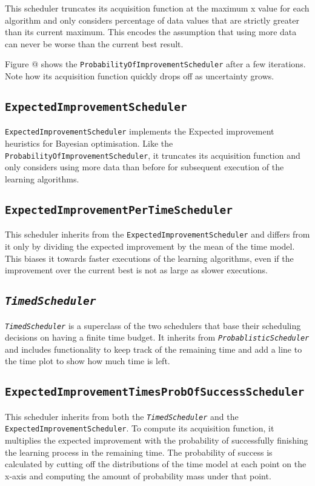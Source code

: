 \documentclass[a4paper,12pt,twoside,openright]{report}
\begin{document}
This scheduler truncates its acquisition function at the maximum x value for each algorithm and only considers percentage of data values that are strictly greater than its current maximum. This encodes the assumption that using more data can never be worse than the current best result.

Figure @ shows the \texttt{ProbabilityOfImprovementScheduler} after a few iterations. Note how its acquisition function quickly drops off as uncertainty grows.

\subsection{\texttt{ExpectedImprovementScheduler}}
\texttt{ExpectedImprovementScheduler} implements the Expected improvement heuristics for Bayesian optimisation. Like the \texttt{ProbabilityOfImprovementScheduler}, it truncates its acquisition function and only considers using more data than before for subsequent execution of the learning algorithms.

\subsection{\texttt{ExpectedImprovementPerTimeScheduler}}
This scheduler inherits from the \texttt{ExpectedImprovementScheduler} and differs from it only by dividing the expected improvement by the mean of the time model. This biases it towards faster executions of the learning algorithms, even if the improvement over the current best is not as large as slower executions.

\subsection{\texttt{\textit{TimedScheduler}}}
\texttt{\textit{TimedScheduler}} is a superclass of the two schedulers that base their scheduling decisions on having a finite time budget. It inherits from \texttt{\textit{ProbablisticScheduler}} and includes functionality to keep track of the remaining time and add a line to the time plot to show how much time is left.

\subsection{\texttt{ExpectedImprovementTimesProbOfSuccessScheduler}}
This scheduler inherits from both the \texttt{\textit{TimedScheduler}} and the \texttt{ExpectedImprovementScheduler}. To compute its acquisition function, it multiplies the expected improvement with the probability of successfully finishing the learning process in the remaining time. The probability of success is calculated by cutting off the distributions of the time model at each point on the x-axis and computing the amount of probability mass under that point.
\end{document}
